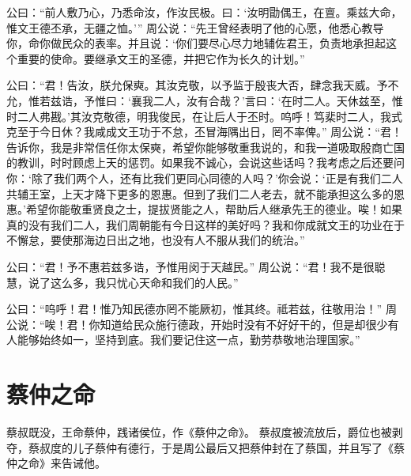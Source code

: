\documentclass[a4paper,12pt,UTF8,twoside]{ctexbook}
\begin{document}
公曰：“前人敷乃心，乃悉命汝，作汝民极。曰：‘汝明勖偶王，在亶。乘兹大命，惟文王德丕承，无疆之恤。’”
周公说：“先王曾经表明了他的心愿，他悉心教导你，命你做民众的表率。并且说：‘你们要尽心尽力地辅佐君王，负责地承担起这个重要的使命。要继承文王的圣德，并把它作为长久的计划。”

公曰：“君！告汝，朕允保奭。其汝克敬，以予监于殷丧大否，肆念我天威。予不允，惟若兹诰，予惟曰：‘襄我二人，汝有合哉？’言曰：‘在时二人。天休兹至，惟时二人弗戡。’其汝克敬德，明我俊民，在让后人于丕时。呜呼！笃棐时二人，我式克至于今日休？我咸成文王功于不怠，丕冒海隅出日，罔不率俾。”
周公说：“君！告诉你，我是非常信任你太保奭，希望你能够敬重我说的，和我一道吸取殷商亡国的教训，时时顾虑上天的惩罚。如果我不诚心，会说这些话吗？我考虑之后还要问你：‘除了我们两个人，还有比我们更同心同德的人吗？’你会说：‘正是有我们二人共辅王室，上天才降下更多的恩惠。但到了我们二人老去，就不能承担这么多的恩惠。’希望你能敬重贤良之士，提拔贤能之人，帮助后人继承先王的德业。唉！如果真的没有我们二人，我们周朝能有今日这样的美好吗？我和你成就文王的功业在于不懈怠，要使那海边日出之地，也没有人不服从我们的统治。”

公曰：“君！予不惠若兹多诰，予惟用闵于天越民。”
周公说：“君！我不是很聪慧，说了这么多，我只忧心天命和我们的人民。”

公曰：“呜呼！君！惟乃知民德亦罔不能厥初，惟其终。祗若兹，往敬用治！”
周公说：“唉！君！你知道给民众施行德政，开始时没有不好好干的，但是却很少有人能够始终如一，坚持到底。我们要记住这一点，勤劳恭敬地治理国家。”

\chapter{蔡仲之命}

蔡叔既没，王命蔡仲，践诸侯位，作《蔡仲之命》。
蔡叔度被流放后，爵位也被剥夺，蔡叔度的儿子蔡仲有德行，于是周公最后又把蔡仲封在了蔡国，并且写了《蔡仲之命》来告诫他。
\end{document}
